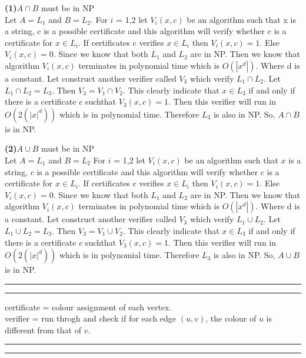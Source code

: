 \documentclass[a4paper, 11pt]{article}
\newcommand{\question}[2] {\vspace{.25in} \hrule\vspace{0.5em}
\noindent{\bf #1: #2} \vspace{0.5em}
\hrule \vspace{.10in}}
\renewcommand{\part}[1] {\vspace{.10in} {\bf (#1)}}
\begin{document}
\part{1}{$A \cap B$ must be in NP}\\
Let $A = L_1$ and $B = L_2$. For $i$ = 1,2 let $V_i(x,c)$ be an algorithm such that x is a string, c is a possible certificate and this algorithm will verify whether c is a certificate for $x \in L_i$. If certificates c verifies $x \in L_i$ then $V_i(x,c) = 1$. Else $V_i(x,c) = 0$. Since we know that both $L_1$ and $L_2$ are in NP. Then we know that algorithm $V_i(x,c)$ terminates in polynomial time which is $O(|x^d|)$. Where d is a constant. Let construct another verifier called $V_3$ which verify $L_1 \cap L_2$. Let $L_1 \cap L_2 = L_3$. Then $V_3 = V_1 \cap V_2$. This clearly indicate that $x \in L_3$ if and only if there is a certificate $c$ suchthat $V_3(x,c) = 1$. Then this verifier will run in $O(2(|x|^d))$ which is in polynomial time. Therefore $L_3$ is also in NP. So, $A \cap B$ is in NP.

\part{2}{$A \cup B$ must be in NP}\\
Let $A = L_1$ and $B = L_2$ For $i$ = 1,2 let $V_i(x,c)$ be an algorithm such that $x$ is a string, $c$ is a possible certificate and this algorithm will verify whether $c$ is a certificate for $x \in L_i$. If certificates c verifies $x \in L_i$ then $V_i(x,c) = 1$. Else $V_i(x,c) = 0$. Since we know that both $L_1$ and $L_2$ are in NP. Then we know that algorithm $V_i(x,c)$ terminates in polynomial time which is $O(|x^d|)$. Where d is a constant. Let construct another verifier called $V_3$ which verify $L_1 \cup L_2$. Let $L_1 \cup L_2 = L_3$. Then $V_3 = V_1 \cup V_2$. This clearly indicate that $x \in L_3$ if and only if there is a certificate $c$ suchthat $V_3(x,c) = 1$. Then this verifier will run in $O(2(|x|^d))$ which is in polynomial time. Therefore $L_3$ is also in NP. So, $A \cup B$ is in NP.

\question{3}{This is NP}
certificate = colour assignment of each vertex.\\
verifier = run throgh and check if for each edge $(u,v)$, the colour of $u$ is different from that of $v$.

\question{4}{NP-Complete}
\end{document}
